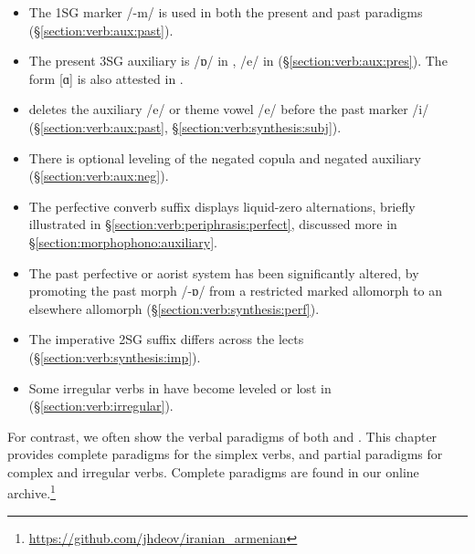 \begin{itemize}
%
%
%
%	
	\item The 1SG marker /{-m}/ is used in both the present and past paradigms (\S\ref{section:verb:aux:past}). 
		\item The present 3SG auxiliary is /{ɒ}/ in {\iaIA}, /{e}/ in {\seaSE} (\S\ref{section:verb:aux:pres}). The form [ɑ] is also attested in \seaCEA. 
		\item {\iaIA} deletes the auxiliary /{e}/ or theme vowel /{e}/ before the past marker /{i}/ (\S\ref{section:verb:aux:past}, \S\ref{section:verb:synthesis:subj}). 
		\item There is optional leveling of the negated copula and negated auxiliary (\S\ref{section:verb:aux:neg}).
		\item The perfective converb suffix displays liquid-zero alternations, briefly illustrated in \S\ref{section:verb:periphrasis:perfect}, discussed more in \S\ref{section:morphophono:auxiliary}.
		\item The past perfective or aorist system has been significantly altered, by promoting the past morph /-ɒ/ from a restricted marked allomorph to an elsewhere allomorph (\S\ref{section:verb:synthesis:perf}).
		\item The imperative 2SG suffix differs across the lects (\S\ref{section:verb:synthesis:imp}).
		
		\item Some irregular verbs in {\seaSE} have become leveled or lost in {\iaIA} (\S\ref{section:verb:irregular}).
\end{itemize}

For contrast, we often show the verbal paradigms of both {\seaSEA} and {\iaIA}. This chapter provides complete paradigms for the simplex verbs, and partial paradigms for complex and irregular verbs. Complete paradigms are found in our online archive.\footnote{\url{https://github.com/jhdeov/iranian_armenian}}

